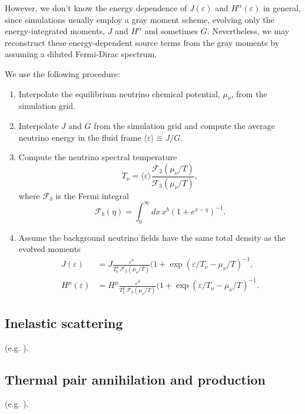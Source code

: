 \documentclass[aps,floatfix,prd,superscriptaddress,twocolumn]{revtex4-1}
\begin{document}
However, we don't know the energy dependence of $J(\varepsilon)$ and
$H^\alpha(\varepsilon)$ in general,
since simulations usually employ a gray moment scheme,
evolving only the energy-integrated moments, $J$ and $H^\alpha$
and sometimes $G$.
Nevertheless, we may reconstruct these energy-dependent source terms
from the gray moments by assuming a diluted Fermi-Dirac spectrum.

We use the following procedure:
\begin{enumerate}
\item
  Interpolate the equilibrium neutrino chemical potential, $\mu_\nu$,
  from the simulation grid.
\item
  Interpolate $J$ and $G$ from the simulation grid and
  compute the average neutrino energy in the fluid frame
  $\langle \varepsilon \rangle \equiv J/G$.
\item
  Compute the neutrino spectral temperature
  \begin{equation}
    T_\nu = \langle \varepsilon \rangle
    \frac{\mathscr{F}_2(\mu_\nu/T)}{\mathscr{F}_3(\mu_\nu/T)},
  \end{equation}
  where $\mathscr{F}_b$ is the Fermi integral
  \begin{equation}
    \mathscr{F}_b(\eta) = \int_0^\infty dx \, x^b (1+e^{x-\eta})^{-1}.
  \end{equation}
\item
  Assume the background neutrino fields have the same total density
  as the evolved moments
  \begin{align}
    J(\varepsilon) &=
    J \frac{\varepsilon^3}{T_\nu^4 \,\mathscr{F}_3(\mu_\nu/T)}
    (1+\exp(\varepsilon/T_\nu-\mu_\nu/T)^{-1}, \\
    H^\mu(\varepsilon) &=
    H^\mu \frac{\varepsilon^3}{T_\nu^4\, \mathscr{F}_3(\mu_\nu/T)}
    (1+\exp(\varepsilon/T_\nu-\mu_\nu/T)^{-1}.
  \end{align}
\end{enumerate}

\subsection{Inelastic scattering}
\label{ssec:sources_si}
(e.g. \cite[Eqn.~A6]{brue1985-core_collapse}).

\subsection{Thermal pair annihilation and production}
\label{ssec:sources_pp}
(e.g. \cite[Eqn.~A9]{brue1985-core_collapse}).


\end{document}
